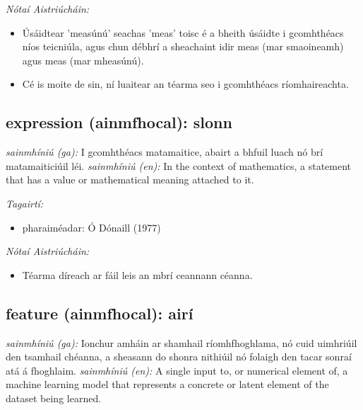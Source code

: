 \documentclass{article}
\begin{document}
 \noindent \textit{Nótaí Aistriúcháin:}
\begin{itemize}
	\item Úsáidtear 'measúnú' seachas 'meas' toisc é a bheith úsáidte i gcomhthéacs níos teicniúla, agus chun débhrí a sheachaint idir meas (mar smaoineamh) agus meas (mar mheasúnú).
	\item Cé is moite de sin, ní luaitear an téarma seo i gcomhthéacs ríomhaireachta.
\end{itemize}


\subsection*{expression (ainmfhocal): slonn} 
 \noindent \textit{sainmhíniú (ga):} I gcomhthéacs matamaitice, abairt a bhfuil luach nó brí matamaiticiúil léi.
\newline\newline
 \noindent \textit{sainmhíniú (en):} In the context of mathematics, a statement that has a value or mathematical meaning attached to it.
\newline

 \noindent \textit{Tagairtí:}
\begin{itemize}
	\item pharaiméadar: Ó Dónaill (1977) \cite{odonaill}
\end{itemize}

 \noindent \textit{Nótaí Aistriúcháin:}
\begin{itemize}
	\item Téarma díreach ar fáil leis an mbrí ceannann céanna.
\end{itemize}


\subsection*{feature (ainmfhocal): airí} 
 \noindent \textit{sainmhíniú (ga):} Ionchur amháin ar shamhail ríomhfhoghlama, nó cuid uimhriúil den tsamhail chéanna, a sheasann do shonra nithiúil nó folaigh den tacar sonraí atá á fhoghlaim.
\newline\newline
 \noindent \textit{sainmhíniú (en):} A single input to, or numerical element of, a machine learning model that represents a concrete or latent element of the dataset being learned.
\newline
\end{document}
